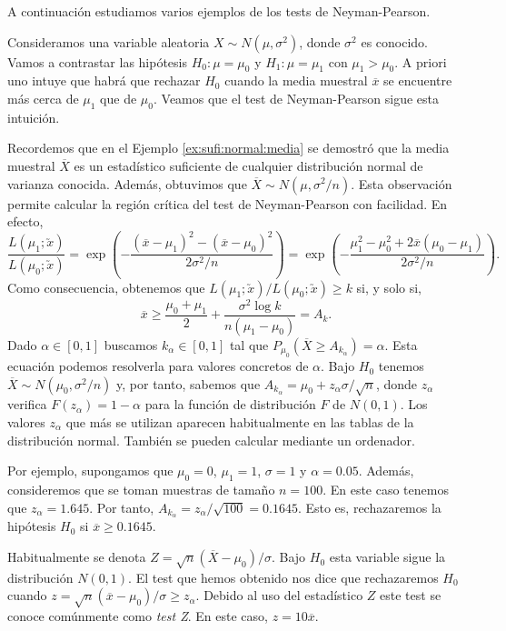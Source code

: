         A continuación estudiamos varios ejemplos de los tests de Neyman-Pearson.

        \begin{ex} \label{ex:np:1}
            Consideramos una variable aleatoria $X \sim N(\mu, \sigma^2)$, donde $\sigma^2$ es conocido. Vamos a contrastar las hipótesis $H_0 : \mu = \mu_0$ y $H_1 : \mu = \mu_1$ con $\mu_1 > \mu_0$. A priori uno intuye que habrá que rechazar $H_0$ cuando la media muestral $\overline{x}$ se encuentre más cerca de $\mu_1$ que de $\mu_0$. Veamos que el test de Neyman-Pearson sigue esta intuición.

            Recordemos que en el Ejemplo \ref{ex:sufi:normal:media} se demostró que la media muestral $\overline{X}$ es un estadístico suficiente de cualquier distribución normal de varianza conocida. Además, obtuvimos que $\overline{X} \sim N(\mu, \sigma^2 / n)$. Esta observación permite calcular la región crítica del test de Neyman-Pearson con facilidad. En efecto,
            \[\frac{L(\mu_1;\utilde{x})}{L(\mu_0;\utilde{x})} = \exp\left(-\frac{(\overline{x} - \mu_1)^2 - (\overline{x} - \mu_0)^2}{2\sigma^2/n}\right) = \exp\left(-\frac{\mu_1^2 - \mu_0^2 + 2\overline{x}(\mu_0-\mu_1)}{2\sigma^2/n}\right).\]
            Como consecuencia, obtenemos que $L(\mu_1;\utilde{x}) / L(\mu_0;\utilde{x}) \ge k$ si, y solo si,
            \[\overline{x} \ge \frac{\mu_0+\mu_1}{2} + \frac{\sigma^2 \log k}{n(\mu_1 - \mu_0)} = A_k.\]
            Dado $\alpha \in [0,1]$ buscamos $k_\alpha \in [0,1]$ tal que $P_{\mu_0}(\overline{X} \ge A_{k_\alpha}) = \alpha$. Esta ecuación podemos resolverla para valores concretos de $\alpha$. Bajo $H_0$ tenemos $\overline{X} \sim N(\mu_0, \sigma^2 / n)$ y, por tanto, sabemos que $A_{k_\alpha} = \mu_0 + z_\alpha \sigma / \sqrt{n}$, donde $z_\alpha$ verifica $F(z_\alpha) = 1 - \alpha$ para la función de distribución $F$ de $N(0,1)$. Los valores $z_\alpha$ que más se utilizan aparecen habitualmente en las tablas de la distribución normal. También se pueden calcular mediante un ordenador.

            Por ejemplo, supongamos que $\mu_0 = 0$, $\mu_1 = 1$, $\sigma = 1$ y $\alpha = 0.05$. Además, consideremos que se toman muestras de tamaño $n = 100$. En este caso tenemos que $z_\alpha = 1.645$. Por tanto, $A_{k_\alpha} = z_\alpha / \sqrt{100} = 0.1645$. Esto es, rechazaremos la hipótesis $H_0$ si $\overline{x} \ge 0.1645$.

            Habitualmente se denota $Z = \sqrt{n} (\overline{X} - \mu_0) / \sigma$. Bajo $H_0$ esta variable sigue la distribución $N(0,1)$. El test que hemos obtenido nos dice que rechazaremos $H_0$ cuando $z = \sqrt{n} (\overline{x} - \mu_0) / \sigma \ge z_\alpha$. Debido al uso del estadístico $Z$ este test se conoce comúnmente como \emph{test Z}. En este caso, $z = 10 \overline{x}$.
        \end{ex}



